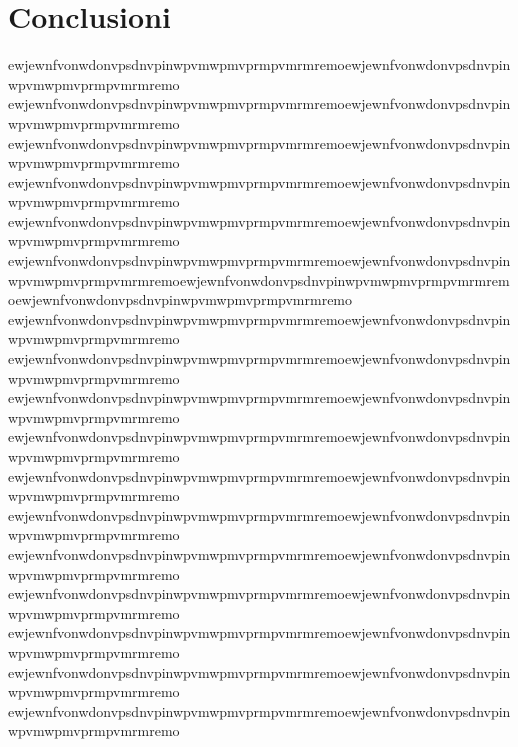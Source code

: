 \documentclass{article}
\begin{document}
\section{Conclusioni}
ewjewnfvonwdonvpsdnvpinwpvmwpmvprmpvmrmremoewjewnfvonwdonvpsdnvpinwpvmwpmvprmpvmrmremo
ewjewnfvonwdonvpsdnvpinwpvmwpmvprmpvmrmremoewjewnfvonwdonvpsdnvpinwpvmwpmvprmpvmrmremo
ewjewnfvonwdonvpsdnvpinwpvmwpmvprmpvmrmremoewjewnfvonwdonvpsdnvpinwpvmwpmvprmpvmrmremo
ewjewnfvonwdonvpsdnvpinwpvmwpmvprmpvmrmremoewjewnfvonwdonvpsdnvpinwpvmwpmvprmpvmrmremo
ewjewnfvonwdonvpsdnvpinwpvmwpmvprmpvmrmremoewjewnfvonwdonvpsdnvpinwpvmwpmvprmpvmrmremo
ewjewnfvonwdonvpsdnvpinwpvmwpmvprmpvmrmremoewjewnfvonwdonvpsdnvpinwpvmwpmvprmpvmrmremoewjewnfvonwdonvpsdnvpinwpvmwpmvprmpvmrmremoewjewnfvonwdonvpsdnvpinwpvmwpmvprmpvmrmremo
ewjewnfvonwdonvpsdnvpinwpvmwpmvprmpvmrmremoewjewnfvonwdonvpsdnvpinwpvmwpmvprmpvmrmremo
ewjewnfvonwdonvpsdnvpinwpvmwpmvprmpvmrmremoewjewnfvonwdonvpsdnvpinwpvmwpmvprmpvmrmremo
ewjewnfvonwdonvpsdnvpinwpvmwpmvprmpvmrmremoewjewnfvonwdonvpsdnvpinwpvmwpmvprmpvmrmremo
ewjewnfvonwdonvpsdnvpinwpvmwpmvprmpvmrmremoewjewnfvonwdonvpsdnvpinwpvmwpmvprmpvmrmremo
ewjewnfvonwdonvpsdnvpinwpvmwpmvprmpvmrmremoewjewnfvonwdonvpsdnvpinwpvmwpmvprmpvmrmremo
ewjewnfvonwdonvpsdnvpinwpvmwpmvprmpvmrmremoewjewnfvonwdonvpsdnvpinwpvmwpmvprmpvmrmremo
ewjewnfvonwdonvpsdnvpinwpvmwpmvprmpvmrmremoewjewnfvonwdonvpsdnvpinwpvmwpmvprmpvmrmremo
ewjewnfvonwdonvpsdnvpinwpvmwpmvprmpvmrmremoewjewnfvonwdonvpsdnvpinwpvmwpmvprmpvmrmremo
ewjewnfvonwdonvpsdnvpinwpvmwpmvprmpvmrmremoewjewnfvonwdonvpsdnvpinwpvmwpmvprmpvmrmremo
ewjewnfvonwdonvpsdnvpinwpvmwpmvprmpvmrmremoewjewnfvonwdonvpsdnvpinwpvmwpmvprmpvmrmremo
ewjewnfvonwdonvpsdnvpinwpvmwpmvprmpvmrmremoewjewnfvonwdonvpsdnvpinwpvmwpmvprmpvmrmremo
\end{document}
